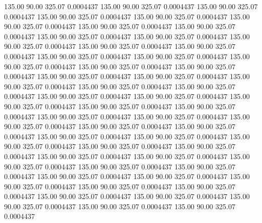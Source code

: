  135.00   90.00  325.07   0.0004437
 135.00   90.00  325.07   0.0004437
 135.00   90.00  325.07   0.0004437
 135.00   90.00  325.07   0.0004437
 135.00   90.00  325.07   0.0004437
 135.00   90.00  325.07   0.0004437
 135.00   90.00  325.07   0.0004437
 135.00   90.00  325.07   0.0004437
 135.00   90.00  325.07   0.0004437
 135.00   90.00  325.07   0.0004437
 135.00   90.00  325.07   0.0004437
 135.00   90.00  325.07   0.0004437
 135.00   90.00  325.07   0.0004437
 135.00   90.00  325.07   0.0004437
 135.00   90.00  325.07   0.0004437
 135.00   90.00  325.07   0.0004437
 135.00   90.00  325.07   0.0004437
 135.00   90.00  325.07   0.0004437
 135.00   90.00  325.07   0.0004437
 135.00   90.00  325.07   0.0004437
 135.00   90.00  325.07   0.0004437
 135.00   90.00  325.07   0.0004437
 135.00   90.00  325.07   0.0004437
 135.00   90.00  325.07   0.0004437
 135.00   90.00  325.07   0.0004437
 135.00   90.00  325.07   0.0004437
 135.00   90.00  325.07   0.0004437
 135.00   90.00  325.07   0.0004437
 135.00   90.00  325.07   0.0004437
 135.00   90.00  325.07   0.0004437
 135.00   90.00  325.07   0.0004437
 135.00   90.00  325.07   0.0004437
 135.00   90.00  325.07   0.0004437
 135.00   90.00  325.07   0.0004437
 135.00   90.00  325.07   0.0004437
 135.00   90.00  325.07   0.0004437
 135.00   90.00  325.07   0.0004437
 135.00   90.00  325.07   0.0004437
 135.00   90.00  325.07   0.0004437
 135.00   90.00  325.07   0.0004437
 135.00   90.00  325.07   0.0004437
 135.00   90.00  325.07   0.0004437
 135.00   90.00  325.07   0.0004437
 135.00   90.00  325.07   0.0004437
 135.00   90.00  325.07   0.0004437
 135.00   90.00  325.07   0.0004437
 135.00   90.00  325.07   0.0004437
 135.00   90.00  325.07   0.0004437
 135.00   90.00  325.07   0.0004437
 135.00   90.00  325.07   0.0004437
 135.00   90.00  325.07   0.0004437
 135.00   90.00  325.07   0.0004437
 135.00   90.00  325.07   0.0004437
